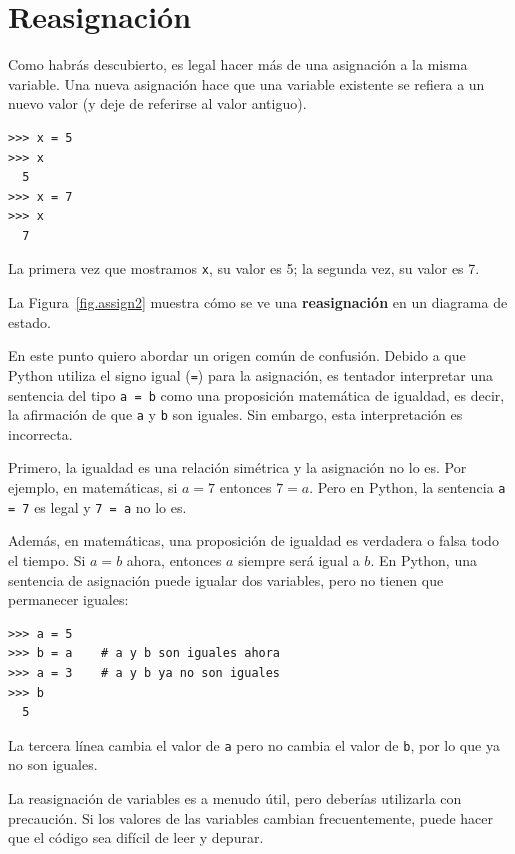 
\section{Reasignación}

Como habrás descubierto, es legal hacer más de una
asignación a la misma variable.  Una nueva asignación hace que una variable existente
se refiera a un nuevo valor (y deje de referirse al valor antiguo).

\begin{Verbatim}[frame=single]
>>> x = 5
>>> x
  5
>>> x = 7
>>> x
  7
\end{Verbatim}
%
La primera vez que mostramos
\texttt{x}, su valor es 5; la segunda vez, su
valor es 7.

La Figura~\ref{fig.assign2} muestra cómo se ve una \textbf{reasignación}
en un diagrama de estado.  

En este punto quiero abordar un origen común de
confusión.
Debido a que Python utiliza el signo igual (\texttt{=}) para la asignación, es
tentador interpretar una sentencia del tipo \texttt{a = b} como una
proposición
matemática de igualdad, es decir, la afirmación de que \texttt{a} y
\texttt{b} son iguales.  Sin embargo, esta interpretación es incorrecta.

Primero, la igualdad es una relación simétrica y la asignación no lo es.  Por
ejemplo, en matemáticas, si $a=7$ entonces $7=a$.  Pero en Python, la
sentencia \texttt{a = 7} es legal y \texttt{7 = a} no lo es.

Además, en matemáticas, una proposición de igualdad es verdadera o
falsa todo el tiempo.  Si $a=b$ ahora, entonces $a$ siempre será igual a $b$.
En Python, una sentencia de asignación puede igualar dos variables, pero
no tienen que permanecer iguales:

\begin{Verbatim}[frame=single]
>>> a = 5
>>> b = a    # a y b son iguales ahora
>>> a = 3    # a y b ya no son iguales
>>> b
  5
\end{Verbatim}
%
La tercera línea cambia el valor de \texttt{a} pero no cambia el
valor de \texttt{b}, por lo que ya no son iguales.

La reasignación de variables es a menudo útil, pero deberías utilizarla
con precaución.  Si los valores de las variables cambian frecuentemente, puede
hacer que el código sea difícil de leer y depurar.

